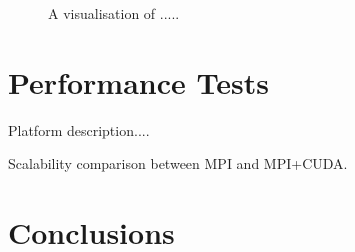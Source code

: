\documentclass{egpubl}
\begin{document}
\begin{figure}[htb]
   
   \caption{\label{fig3:movie}
   A visualisation of .....}
\end{figure}
\section{Performance Tests}

Platform description....

Scalability comparison between MPI and MPI+CUDA.

 

\section{Conclusions}

 


%



\end{document}
